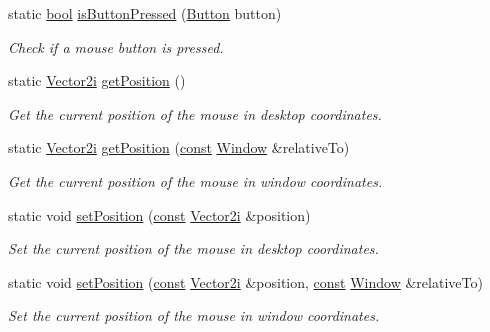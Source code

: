 \begin{DoxyCompactItemize}
static \hyperlink{term__entry_8h_a002004ba5d663f149f6c38064926abac}{bool} \hyperlink{classsf_1_1_mouse_ab647159eb88e369a0332a9c5a7ba6687}{is\-Button\-Pressed} (\hyperlink{classsf_1_1_mouse_a4fb128be433f9aafe66bc0c605daaa90}{Button} button)
\begin{DoxyCompactList}\small\item\em Check if a mouse button is pressed. \end{DoxyCompactList}\item 
static \hyperlink{namespacesf_a0eed58bf66694ebbc55f72ca7de840d9}{Vector2i} \hyperlink{classsf_1_1_mouse_ac368680f797b7f6e4f50b5b7928c1387}{get\-Position} ()
\begin{DoxyCompactList}\small\item\em Get the current position of the mouse in desktop coordinates. \end{DoxyCompactList}\item 
static \hyperlink{namespacesf_a0eed58bf66694ebbc55f72ca7de840d9}{Vector2i} \hyperlink{classsf_1_1_mouse_a93b4d2ebef728e77a0ec9d83c1e0b0c8}{get\-Position} (\hyperlink{term__entry_8h_a57bd63ce7f9a353488880e3de6692d5a}{const} \hyperlink{classsf_1_1_window}{Window} \&relative\-To)
\begin{DoxyCompactList}\small\item\em Get the current position of the mouse in window coordinates. \end{DoxyCompactList}\item 
static void \hyperlink{classsf_1_1_mouse_a1222e16c583be9e3d176d86e0b7817d7}{set\-Position} (\hyperlink{term__entry_8h_a57bd63ce7f9a353488880e3de6692d5a}{const} \hyperlink{namespacesf_a0eed58bf66694ebbc55f72ca7de840d9}{Vector2i} \&position)
\begin{DoxyCompactList}\small\item\em Set the current position of the mouse in desktop coordinates. \end{DoxyCompactList}\item 
static void \hyperlink{classsf_1_1_mouse_ad9b16ec7041531315f06b26b413dfea8}{set\-Position} (\hyperlink{term__entry_8h_a57bd63ce7f9a353488880e3de6692d5a}{const} \hyperlink{namespacesf_a0eed58bf66694ebbc55f72ca7de840d9}{Vector2i} \&position, \hyperlink{term__entry_8h_a57bd63ce7f9a353488880e3de6692d5a}{const} \hyperlink{classsf_1_1_window}{Window} \&relative\-To)
\begin{DoxyCompactList}\small\item\em Set the current position of the mouse in window coordinates. \end{DoxyCompactList}\end{DoxyCompactItemize}


